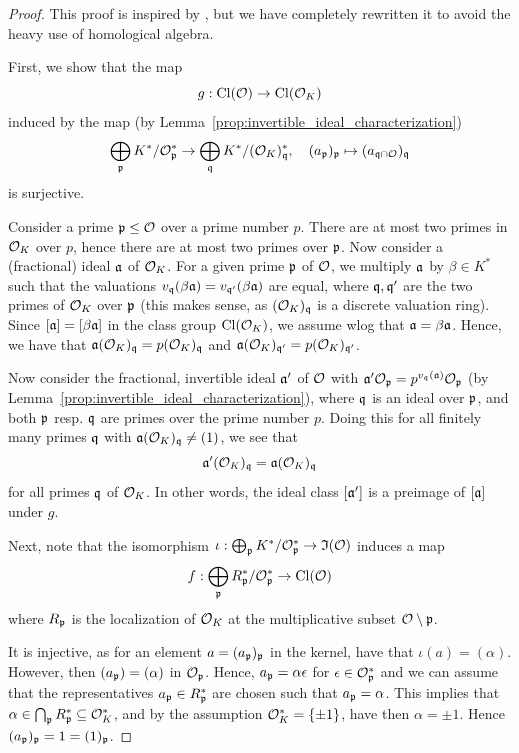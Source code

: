 \begin{proof}
    This proof is inspired by \cite[Prop.~I.12.11]{neukirch}, but we have completely rewritten it to avoid the heavy use of homological algebra.

    First, we show that the map
    \begin{equation*}
        g: \mathrm{Cl}(\mathcal{O}) \to \mathrm{Cl}(\mathcal{O}_K)
    \end{equation*}
    induced by the map (by Lemma~\ref{prop:invertible_ideal_characterization})
    \begin{equation*}
        \bigoplus_{\mathfrak{p}} K^*/\mathcal{O}_{\mathfrak{p}}^* \to \bigoplus_{\mathfrak{q}} K^*/(\mathcal{O}_K)_{\mathfrak{q}}^*, \quad (a_{\mathfrak{p}})_{\mathfrak{p}} \mapsto (a_{\mathfrak{q} \cap \mathcal{O}})_{\mathfrak{q}}
    \end{equation*}
    is surjective.

    Consider a prime $\mathfrak{p} \leq \mathcal{O}$ over a prime number $p$.
    There are at most two primes in $\mathcal{O}_K$ over $p$, hence there are at most two primes over $\mathfrak{p}$.
    Now consider a (fractional) ideal $\mathfrak{a}$ of $\mathcal{O}_K$.
    For a given prime $\mathfrak{p}$ of $\mathcal{O}$, we multiply $\mathfrak{a}$ by $\beta \in K^*$ such that the valuations $v_{\mathfrak{q}}(\beta\mathfrak{a}) = v_{\mathfrak{q}'}(\beta\mathfrak{a})$ are equal, where $\mathfrak{q}, \mathfrak{q}'$ are the two primes of $\mathcal{O}_K$ over $\mathfrak{p}$ (this makes sense, as $(\mathcal{O}_K)_{\mathfrak{q}}$ is a discrete valuation ring).
    Since $[\mathfrak{a}] = [\beta\mathfrak{a}]$ in the class group $\mathrm{Cl}(\mathcal{O}_K)$, we assume wlog that $\mathfrak{a} = \beta\mathfrak{a}$.
    Hence, we have that $\mathfrak{a}(\mathcal{O}_K)_{\mathfrak{q}} = p(\mathcal{O}_K)_{\mathfrak{q}}$ and $\mathfrak{a}(\mathcal{O}_K)_{\mathfrak{q}'} = p(\mathcal{O}_K)_{\mathfrak{q}'}$.
    
    Now consider the fractional, invertible ideal $\mathfrak{a}'$ of $\mathcal{O}$ with $\mathfrak{a}'\mathcal{O}_{\mathfrak{p}} = p^{v_{\mathfrak{q}}(\mathfrak{a})}\mathcal{O}_{\mathfrak{p}}$ (by Lemma~\ref{prop:invertible_ideal_characterization}), where $\mathfrak{q}$ is an ideal over $\mathfrak{p}$, and both $\mathfrak{p}$ resp. $\mathfrak{q}$ are primes over the prime number $p$.
    Doing this for all finitely many primes $\mathfrak{q}$ with $\mathfrak{a}(\mathcal{O}_K)_{\mathfrak{q}} \neq (1)$, we see that
    \begin{equation*}
        \mathfrak{a}'(\mathcal{O}_K)_{\mathfrak{q}} = \mathfrak{a}(\mathcal{O}_K)_{\mathfrak{q}}
    \end{equation*}
    for all primes $\mathfrak{q}$ of $\mathcal{O}_K$.
    In other words, the ideal class $[\mathfrak{a}']$ is a preimage of $[\mathfrak{a}]$ under $g$.

    Next, note that the isomorphism $\iota: \bigoplus_{\mathfrak{p}} K^*/\mathcal{O}_{\mathfrak{p}}^* \to \mathfrak{I}(\mathcal{O})$ induces a map
    \begin{equation*}
        f: \bigoplus_{\mathfrak{p}} R_{\mathfrak{p}}^*/\mathcal{O}_{\mathfrak{p}}^* \to \mathrm{Cl}(\mathcal{O})
    \end{equation*}
    where $R_{\mathfrak{p}}$ is the localization of $\mathcal{O}_K$ at the multiplicative subset $\mathcal{O} \setminus \mathfrak{p}$.

    It is injective, as for an element $a = (a_{\mathfrak{p}})_{\mathfrak{p}}$ in the kernel, have that $\iota(a) = (\alpha)$.
    However, then $(a_{\mathfrak{p}}) = (\alpha)$ in $\mathcal{O}_{\mathfrak{p}}$.
    Hence, $a_{\mathfrak{p}} = \alpha\epsilon$ for $\epsilon \in \mathcal{O}_{\mathfrak{p}}^*$ and we can assume that the representatives $a_{\mathfrak{p}} \in R_{\mathfrak{p}}^*$ are chosen such that $a_{\mathfrak{p}} = \alpha$.
    This implies that $\alpha \in \bigcap_{\mathfrak{p}} R_{\mathfrak{p}}^* \subseteq \mathcal{O}_K^*$, and by the assumption $\mathcal{O}_K^* = \{ \pm 1 \}$, have then $\alpha = \pm 1$.
    Hence $(a_{\mathfrak{p}})_{\mathfrak{p}} = 1 = (1)_{\mathfrak{p}}$.


\end{proof}
